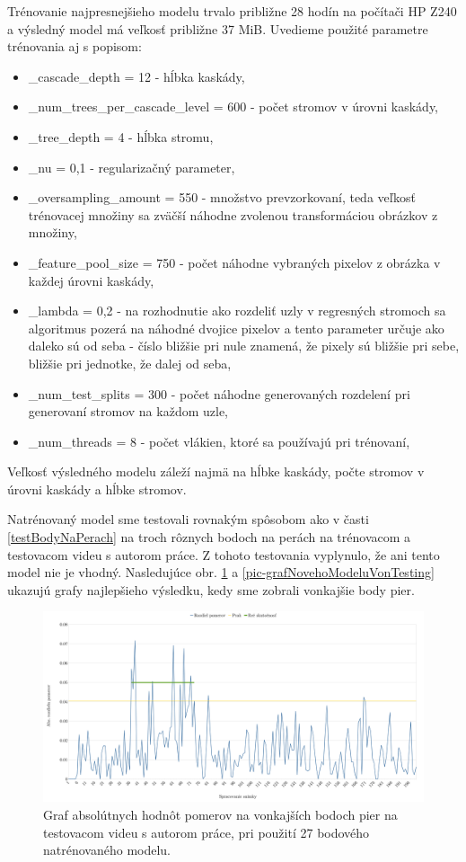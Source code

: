 Trénovanie najpresnejšieho modelu trvalo približne 28 hodín na počítači  HP Z240 a výsledný model má veľkosť približne 37 MiB. 
Uvedieme použité parametre trénovania aj s popisom:
 \begin{itemize}
\item \_cascade\_depth = 12 - hĺbka kaskády, 
\item \_num\_trees\_per\_cascade\_level = 600 - počet stromov v úrovni kaskády, 
\item \_tree\_depth = 4 - hĺbka stromu, 
\item \_nu = 0,1 - regularizačný parameter, 
\item \_oversampling\_amount = 550 - množstvo prevzorkovaní, teda veľkosť trénovacej množiny sa zväčší náhodne zvolenou transformáciou obrázkov z množiny, 
\item \_feature\_pool\_size = 750 - počet náhodne vybraných pixelov z obrázka v každej úrovni kaskády, 
\item \_lambda = 0,2 - na rozhodnutie ako rozdeliť uzly v regresných stromoch sa algoritmus pozerá na náhodné dvojice pixelov a tento parameter určuje ako daleko sú od seba - číslo bližšie pri nule znamená, že pixely sú bližšie pri sebe, bližšie pri jednotke, že dalej od seba, 
\item \_num\_test\_splits = 300 - počet náhodne generovaných rozdelení pri generovaní stromov na každom uzle,
\item \_num\_threads = 8 - počet vlákien, ktoré sa používajú pri trénovaní, 
\end{itemize} 
Veľkosť výsledného modelu záleží najmä na hĺbke kaskády, počte stromov v úrovni kaskády a hĺbke stromov. 

Natrénovaný model sme testovali rovnakým spôsobom ako v časti \ref{testBodyNaPerach} na troch rôznych bodoch na perách na trénovacom a testovacom videu s autorom práce.
Z tohoto testovania vyplynulo, že ani tento model nie je vhodný. 
Nasledujúce obr. \ref{pic-grafNovehoModeluVonTrening} a \ref{pic-grafNovehoModeluVonTesting} ukazujú grafy najlepšieho výsledku, kedy sme zobrali vonkajšie body pier.

\begin{figure}[H]
	\begin{center}
		\includegraphics[width=\textwidth]{pics/grafNovehoModeluVonTrening.png}
		\caption{Graf absolútnych hodnôt pomerov na vonkajších bodoch pier na testovacom videu s autorom práce, pri použití 27 bodového natrénovaného modelu.}
		\label{pic-grafNovehoModeluVonTrening}
	\end{center}
\end{figure}

